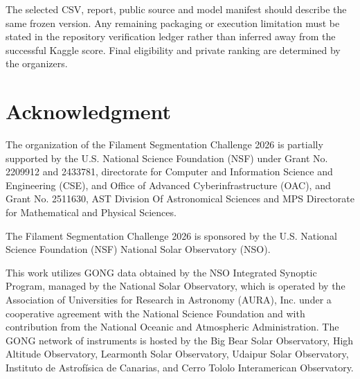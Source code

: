 \documentclass[sigconf]{acmart}
\begin{document}
The selected CSV, report, public source and model manifest should describe the same frozen version. Any remaining packaging or execution limitation must be stated in the repository verification ledger rather than inferred away from the successful Kaggle score. Final eligibility and private ranking are determined by the organizers.

\clearpage
\section{Acknowledgment}\label{sec:acknowledgment}
    The organization of the Filament Segmentation Challenge 2026 is partially supported by the U.S. National Science Foundation (NSF) under Grant No. 2209912 and 2433781, directorate for Computer and Information Science and Engineering (CSE), and Office of Advanced Cyberinfrastructure (OAC), and Grant No. 2511630, AST Division Of Astronomical Sciences and MPS Directorate for Mathematical and Physical Sciences.

    The Filament Segmentation Challenge 2026 is sponsored by the U.S. National Science Foundation (NSF) National Solar Observatory (NSO). 

    This work utilizes GONG data obtained by the NSO Integrated Synoptic Program, managed by the National Solar Observatory, which is operated by the Association of Universities for Research in Astronomy (AURA), Inc. under a cooperative agreement with the National Science Foundation and with contribution from the National Oceanic and Atmospheric Administration. The GONG network of instruments is hosted by the Big Bear Solar Observatory, High Altitude Observatory, Learmonth Solar Observatory, Udaipur Solar Observatory, Instituto de Astrofísica de Canarias, and Cerro Tololo Interamerican Observatory.




\end{document}
